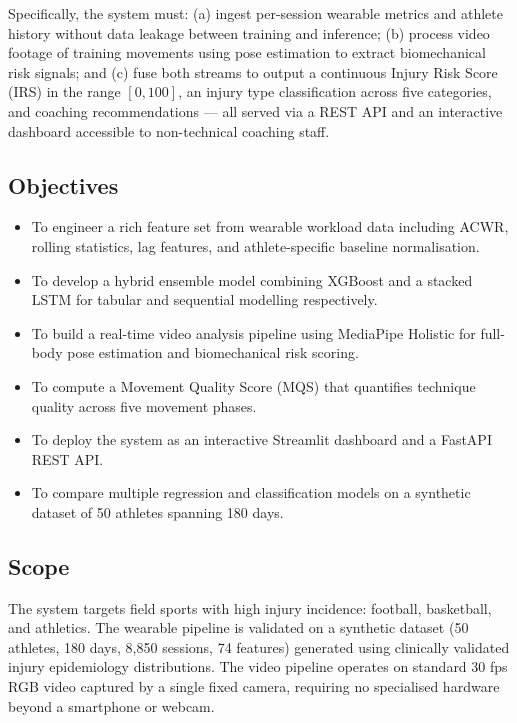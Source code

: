 \documentclass[12pt,a4paper]{report}
\begin{document}
\par
Specifically, the system must: (a) ingest per-session wearable metrics and athlete history without data leakage between training and inference; (b) process video footage of training movements using pose estimation to extract biomechanical risk signals; and (c) fuse both streams to output a continuous Injury Risk Score (IRS) in the range $[0, 100]$, an injury type classification across five categories, and coaching recommendations — all served via a REST API and an interactive dashboard accessible to non-technical coaching staff.

\subsection*{Objectives}

\begin{itemize}
  \item To engineer a rich feature set from wearable workload data including ACWR, rolling statistics, lag features, and athlete-specific baseline normalisation.
  \item To develop a hybrid ensemble model combining XGBoost and a stacked LSTM for tabular and sequential modelling respectively.
  \item To build a real-time video analysis pipeline using MediaPipe Holistic for full-body pose estimation and biomechanical risk scoring.
  \item To compute a Movement Quality Score (MQS) that quantifies technique quality across five movement phases.
  \item To deploy the system as an interactive Streamlit dashboard and a FastAPI REST API.
  \item To compare multiple regression and classification models on a synthetic dataset of 50 athletes spanning 180 days.
\end{itemize}

\subsection*{Scope}

The system targets field sports with high injury incidence: football, basketball, and athletics. The wearable pipeline is validated on a synthetic dataset (50 athletes, 180 days, 8,850 sessions, 74 features) generated using clinically validated injury epidemiology distributions. The video pipeline operates on standard 30 fps RGB video captured by a single fixed camera, requiring no specialised hardware beyond a smartphone or webcam.
\end{document}
